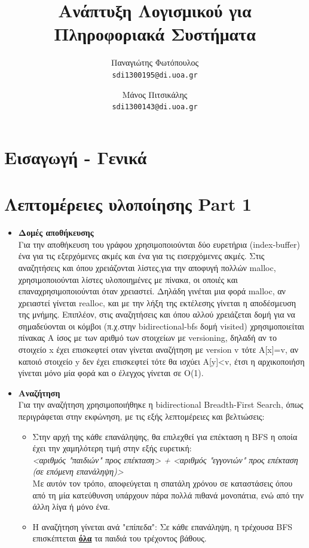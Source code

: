 \documentclass[11pt]{article}
\title{Ανάπτυξη Λογισμικού για Πληροφοριακά Συστήματα}
\author{Παναγιώτης Φωτόπουλος\\
  \texttt{sdi1300195@di.uoa.gr}
  \and Μάνος Πιτσικάλης\\
  \texttt{sdi1300143@di.uoa.gr}}
\date{}
\begin{document}
\maketitle


\section{Εισαγωγή - Γενικά}

\section{Λεπτομέρειες υλοποίησης Part 1}
\begin{itemize}
\item \textbf{Δομές αποθήκευσης}\\ Για την αποθήκευση του γράφου χρησιμοποιούνται δύο ευρετήρια (index-buffer) ένα για τις εξερχόμενες ακμές και ένα για τις εισερχόμενες ακμές. Στις αναζητήσεις και όπου χρειάζονται λίστες,για την αποφυγή πολλών malloc, χρησιμοποιούνται λίστες υλοποιημένες με πίνακα, οι οποιές και επαναχρησιμοποιούνται όταν χρειαστεί. Δηλάδη γινέται μια φορά malloc, αν χρειαστεί γίνεται realloc, και με την λήξη της εκτέλεσης γίνεται η αποδέσμευση της μνήμης. Επιπλέον, στις αναζητήσεις και όπου αλλού χρειάζεται δομή για να σημαδεύονται οι κόμβοι (π.χ.στην bidirectional-bfs δομή visited) χρησιμοποιείται πίνακας A ίσος με των αριθμό των στοιχείων με versioning, δηλαδή αν το στοιχείο x έχει επισκεφτεί οταν γίνεται αναζήτηση με version v τότε A[x]=v, αν καποιό στοιχείο y δεν έχει επισκεφτεί τότε θα ισχύει A[y]<v, έτσι η αρχικοποιήση γίνεται μόνο μία φορά και ο έλεγχος γίνεται σε O(1).
\item \textbf{Αναζήτηση}\\ Για την αναζήτηση χρησιμοποιήθηκε η bidirectional Breadth-First Search, όπως περιγράφεται στην εκφώνηση, με τις εξής λεπτομέρειες και βελτιώσεις:
\begin{itemize}
\item Στην αρχή της κάθε επανάληψης, θα επιλεχθεί για επέκταση η BFS η οποία έχει την χαμηλότερη τιμή στην εξής ευρετική:\\
\textit{<αριθμός "παιδιών" προς επέκταση> + <αριθμός "εγγονιών" προς επέκταση (σε επόμενη επανάληψη)>}\\
Με αυτόν τον τρόπο, αποφεύγεται η σπατάλη χρόνου σε καταστάσεις όπου από τη μία κατεύθυνση υπάρχουν πάρα πολλά πιθανά μονοπάτια, ενώ από την άλλη λίγα ή μόνο ένα.
\item Η αναζήτηση γίνεται ανά "επίπεδα": Σε κάθε επανάληψη, η τρέχουσα BFS επισκέπτεται \textbf{\underline{όλα}} τα παιδιά του τρέχοντος βάθους.

\end{itemize}
\end{itemize}
\end{document}
